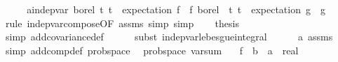 \begin{isabellebody}
%
\isadelimproof
%
\endisadelimproof
%
\isatagproof
{}\isamarkupfalse%
\ {\isacharminus}{\kern0pt}\isanewline
\ \ \isamarkupfalse%
\ a{\isacharcolon}{\kern0pt}{\isachardoublequoteopen}indep{\isacharunderscore}{\kern0pt}var\ borel\ {\isacharparenleft}{\kern0pt}{\isacharparenleft}{\kern0pt}{\isasymlambda}t{\isachardot}{\kern0pt}\ t\ {\isacharminus}{\kern0pt}\ expectation\ f{\isacharparenright}{\kern0pt}\ {\isasymcirc}\ f{\isacharparenright}{\kern0pt}\ borel\ \ {\isacharparenleft}{\kern0pt}{\isacharparenleft}{\kern0pt}{\isasymlambda}t{\isachardot}{\kern0pt}\ t\ {\isacharminus}{\kern0pt}\ expectation\ g{\isacharparenright}{\kern0pt}\ {\isasymcirc}\ g{\isacharparenright}{\kern0pt}{\isachardoublequoteclose}\isanewline
\ \ \ \ \isamarkupfalse%
\ {\isacharparenleft}{\kern0pt}rule\ indep{\isacharunderscore}{\kern0pt}var{\isacharunderscore}{\kern0pt}compose{\isacharbrackleft}{\kern0pt}OF\ assms{\isacharparenleft}{\kern0pt}{}{\isacharparenright}{\kern0pt}{\isacharbrackright}{\kern0pt}{\isacharcomma}{\kern0pt}\ simp{\isacharcomma}{\kern0pt}\ simp{\isacharparenright}{\kern0pt}\isanewline
\isanewline
\ \ \isamarkupfalse%
\ {\isacharquery}{\kern0pt}thesis\isanewline
\ \ \ \ \isamarkupfalse%
\ {\isacharparenleft}{\kern0pt}simp\ add{\isacharcolon}{\kern0pt}covariance{\isacharunderscore}{\kern0pt}def{\isacharparenright}{\kern0pt}\isanewline
\ \ \ \ \isamarkupfalse%
\ {\isacharparenleft}{\kern0pt}subst\ indep{\isacharunderscore}{\kern0pt}var{\isacharunderscore}{\kern0pt}lebesgue{\isacharunderscore}{\kern0pt}integral{\isacharparenright}{\kern0pt}\isanewline
\ \ \ \ \isamarkupfalse%
\ a\ assms\ \isamarkupfalse%
\ {\isacharparenleft}{\kern0pt}simp\ add{\isacharcolon}{\kern0pt}comp{\isacharunderscore}{\kern0pt}def\ prob{\isacharunderscore}{\kern0pt}space{\isacharparenright}{\kern0pt}{\isacharplus}{\kern0pt}\isanewline
{}\isamarkupfalse%
%
\endisatagproof
{\isafoldproof}%
%
\isadelimproof
\isanewline
%
\endisadelimproof
\isanewline
{}\isamarkupfalse%
\ {\isacharparenleft}{\kern0pt}\ prob{\isacharunderscore}{\kern0pt}space{\isacharparenright}{\kern0pt}\ var{\isacharunderscore}{\kern0pt}sum{\isacharunderscore}{\kern0pt}{}{\isacharcolon}{\kern0pt}\isanewline
\ \ \ f\ {\isacharcolon}{\kern0pt}{\isacharcolon}{\kern0pt}\ {\isachardoublequoteopen}{\isacharprime}{\kern0pt}b\ {\isasymRightarrow}\ {\isacharprime}{\kern0pt}a\ {\isasymRightarrow}\ real{\isachardoublequoteclose}\isanewline

\end{isabellebody}
